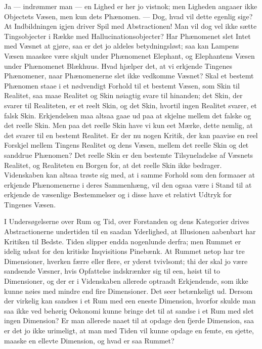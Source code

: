 \documentclass[12pt]{book}
\newcommand{\apage}[1]{\marginnote{\footnotesize\textit{[#1]}}}
\begin{document}
Ja --- indrømmer man --- en Lighed er her jo vistnok; men Ligheden angaaer ikke
Objectets Væsen, men kun dets Phænomen. --- Dog, hvad vil dette egenlig
sige? At Indbildningen igjen driver Spil med Abstractionen! Man vil dog
vel ikke sætte Tingsobjecter i Række med Hallucinationsobjecter? Har
Phænomenet slet Intet med Væsnet at gjøre, saa er det jo aldeles
betydningsløst; saa kan Lampens Væsen maaskee være skjult under Phænomenet
Elephant, og Elephantens Væsen under Phænomenet Blækhuus. Hvad hjælper
det, at vi erkjende Tingenes Phænomener, naar Phænomenerne slet ikke
vedkomme Væsnet? Skal et bestemt Phænomen staae i et nødvendigt Forhold
til et bestemt Væsen, som Skin til Realitet, saa maae Realitet og Skin
nøiagtig svare til hinanden; det Skin, der svarer til Realiteten, er et
reelt Skin, og det Skin, hvortil ingen Realitet svarer, et falsk Skin.  \apage{57}
Erkjendelsen maa altsaa gaae ud paa at skjelne mellem det falske og det
reelle Skin. Men paa det reelle Skin have vi kun eet Mærke, dette nemlig,
at det svarer til en bestemt Realitet. Er der nu nogen Kritik, der kan
paavise en reel Forskjel mellem Tingens Realitet og dens Væsen, mellem det
reelle Skin og det sanddrue Phænomen? Det reelle Skin er den bestemte
Tilsyneladelse af Væsnets Realitet, og Realiteten en Borgen for, at det
reelle Skin ikke bedrager. Videnskaben kan altsaa trøste sig med, at i
samme Forhold som den formaaer at erkjende Phænomenerne i deres
Sammenhæng, vil den ogsaa være i Stand til at erkjende de væsenlige
Bestemmelser og i disse have et relativt Udtryk for Tingenes Væsen.

I Undersøgelserne over Rum og Tid, over Forstanden og dens Kategorier
drives Abstractionerne undertiden til en saadan Yderlighed, at Illusionen
aabenbart har Kritiken til Bedste. Tiden slipper endda nogenlunde derfra;
men Rummet er idelig udsat for den kritiske Inqvisitions Pinebænk. At
Rummet netop har tre Dimensioner, hverken færre eller flere, er yderst
tvivlsomt; thi der skal jo være sandsende Væsner, hvis Opfattelse
indskrænker sig til een, høist til to Dimensioner, og der er i Videnskaben
allerede optraadt Erkjendende, som ikke kunne nøies med mindre end fire
Dimensioner. Det seer betænkeligt ud. Dersom der virkelig kan sandses i et
Rum med een eneste Dimension, hvorfor skulde man saa ikke ved behørig
Oekonomi kunne bringe det til at sandse i et Rum med slet ingen Dimension?
Er man allerede naaet til \apage{58} at opdage den fjerde Dimension, saa er det jo
ikke urimeligt, at man med Tiden vil kunne opdage en femte, en sjette,
maaske en ellevte Dimension, og hvad er saa Rummet?
\end{document}
